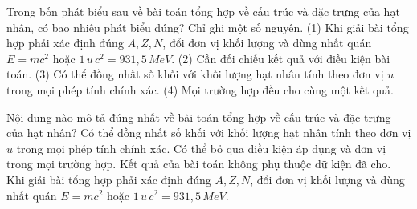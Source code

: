 \begin{ex}
Trong bốn phát biểu sau về bài toán tổng hợp về cấu trúc và đặc trưng của hạt nhân, có bao nhiêu phát biểu đúng? Chỉ ghi một số nguyên. (1) Khi giải bài tổng hợp phải xác định đúng $A,Z,N$, đổi đơn vị khối lượng và dùng nhất quán $E=mc^2$ hoặc $1\,u\,c^2=931,5\,MeV$. (2) Cần đối chiếu kết quả với điều kiện bài toán. (3) Có thể đồng nhất số khối với khối lượng hạt nhân tính theo đơn vị $u$ trong mọi phép tính chính xác. (4) Mọi trường hợp đều cho cùng một kết quả.
\end{ex}

\begin{ex}
Nội dung nào mô tả đúng nhất về bài toán tổng hợp về cấu trúc và đặc trưng của hạt nhân?
\choice
{Có thể đồng nhất số khối với khối lượng hạt nhân tính theo đơn vị $u$ trong mọi phép tính chính xác.}
{Có thể bỏ qua điều kiện áp dụng và đơn vị trong mọi trường hợp.}
{Kết quả của bài toán không phụ thuộc dữ kiện đã cho.}
{\True Khi giải bài tổng hợp phải xác định đúng $A,Z,N$, đổi đơn vị khối lượng và dùng nhất quán $E=mc^2$ hoặc $1\,u\,c^2=931,5\,MeV$.}
\end{ex}

